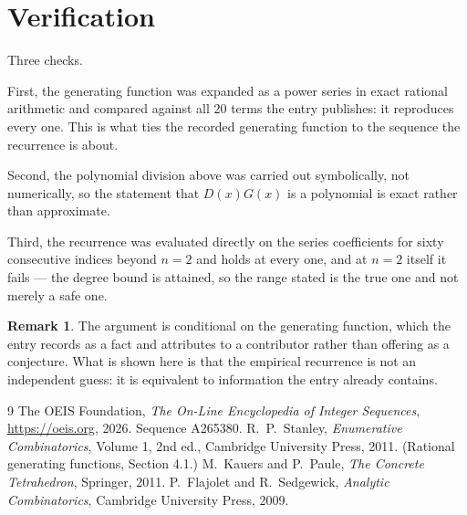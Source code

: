 \documentclass[11pt,a4paper]{article}
\theoremstyle{plain}
\theoremstyle{definition}
\newtheorem{remark}[theorem]{Remark}
\begin{document}
\section{Verification}

Three checks.

First, the generating function was expanded as a power series in exact rational arithmetic and
compared against all $20$ terms the entry publishes: it reproduces every one. This is
what ties the recorded generating function to the sequence the recurrence is about.

Second, the polynomial division above was carried out symbolically, not numerically, so the
statement that $D(x)G(x)$ is a polynomial is exact rather than approximate.

Third, the recurrence was evaluated directly on the series coefficients for sixty consecutive
indices beyond $n=2$ and holds at every one, and at $n=2$ itself it fails --- the
degree bound is attained, so the range stated is the true one and not merely a safe one.

\begin{remark}
The argument is conditional on the generating function, which the entry records as a fact and
attributes to a contributor rather than offering as a conjecture. What is shown here is that
the empirical recurrence is not an independent guess: it is equivalent to information the
entry already contains.
\end{remark}

\begin{thebibliography}{9}
 The OEIS Foundation, \emph{The On-Line Encyclopedia of Integer
Sequences}, \url{https://oeis.org}, 2026. Sequence A265380.
 R.~P.~Stanley, \emph{Enumerative Combinatorics}, Volume 1, 2nd ed.,
Cambridge University Press, 2011. (Rational generating functions, Section 4.1.)
 M.~Kauers and P.~Paule, \emph{The Concrete Tetrahedron}, Springer, 2011.
 P.~Flajolet and R.~Sedgewick, \emph{Analytic Combinatorics}, Cambridge
University Press, 2009.
\end{thebibliography}
\end{document}
